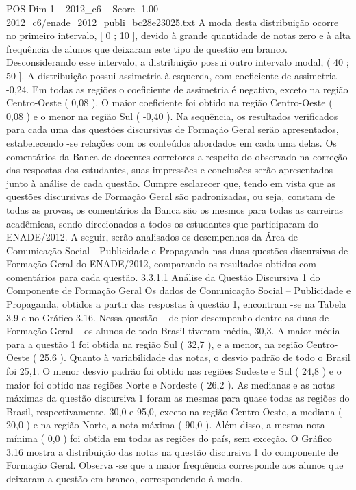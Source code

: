 \begin{textsample}{POS Dim 1 – 2012\_c6 – Score -1.00 – 2012\_c6/enade\_2012\_publi\_bc28e23025.txt}
A moda desta distribuição ocorre no primeiro intervalo, [ 0 ; 10 ], devido à grande quantidade de notas zero e à alta frequência de alunos que deixaram este tipo de questão em branco.
Desconsiderando esse intervalo, a distribuição possui outro intervalo modal, ( 40 ; 50 ].
A distribuição possui assimetria à esquerda, com coeficiente de assimetria -0,24.
Em todas as regiões o coeficiente de assimetria é negativo, exceto na região Centro-Oeste ( 0,08 ).
O maior coeficiente foi obtido na região Centro-Oeste ( 0,08 ) e o menor na região Sul ( -0,40 ).
Na sequência, os resultados verificados para cada uma das questões discursivas de Formação Geral serão apresentados, estabelecendo -se relações com os conteúdos abordados em cada uma delas.
Os comentários da Banca de docentes corretores a respeito do observado na correção das respostas dos estudantes, suas impressões e conclusões serão apresentados junto à análise de cada questão.
Cumpre esclarecer que, tendo em vista que as questões discursivas de Formação Geral são padronizadas, ou seja, constam de todas as provas, os comentários da Banca são os mesmos para todas as carreiras acadêmicas, sendo direcionados a todos os estudantes que participaram do ENADE/2012.
A seguir, serão analisados os desempenhos da Área de Comunicação Social - Publicidade e Propaganda nas duas questões discursivas de Formação Geral do ENADE/2012, comparando os resultados obtidos com comentários para cada questão. 3.3.1.1 Análise da Questão Discursiva 1 do Componente de Formação Geral Os dados de Comunicação Social – Publicidade e Propaganda, obtidos a partir das respostas à questão 1, encontram -se na Tabela 3.9 e no Gráfico 3.16.
Nessa questão – de pior desempenho dentre as duas de Formação Geral – os alunos de todo Brasil tiveram média, 30,3.
A maior média para a questão 1 foi obtida na região Sul ( 32,7 ), e a menor, na região Centro-Oeste ( 25,6 ).
Quanto à variabilidade das notas, o desvio padrão de todo o Brasil foi 25,1.
O menor desvio padrão foi obtido nas regiões Sudeste e Sul ( 24,8 ) e o maior foi obtido nas regiões Norte e Nordeste ( 26,2 ).
As medianas e as notas máximas da questão discursiva 1 foram as mesmas para quase todas as regiões do Brasil, respectivamente, 30,0 e 95,0, exceto na região Centro-Oeste, a mediana ( 20,0 ) e na região Norte, a nota máxima ( 90,0 ).
Além disso, a mesma nota mínima ( 0,0 ) foi obtida em todas as regiões do país, sem exceção.
O Gráfico 3.16 mostra a distribuição das notas na questão discursiva 1 do componente de Formação Geral.
Observa -se que a maior frequência corresponde aos alunos que deixaram a questão em branco, correspondendo à moda.

\end{textsample}
